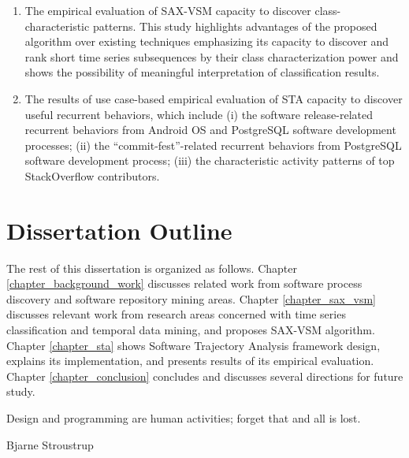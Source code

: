 \begin{enumerate}
\begin{enumerate}
 \item The empirical evaluation of SAX-VSM capacity to discover class-characteristic patterns.
This study highlights advantages of the proposed algorithm over existing techniques 
emphasizing
its capacity to discover and rank short time series subsequences by their class 
characterization power and 
shows the possibility of meaningful interpretation of classification results.
 \item The results of use case-based empirical evaluation of STA capacity to discover useful recurrent 
behaviors, which include 
(i) the software release-related recurrent behaviors from Android OS and PostgreSQL software development processes;
(ii) the ``commit-fest''-related recurrent behaviors from PostgreSQL software development process; 
(iii) the characteristic activity patterns of top StackOverflow contributors.
\end{enumerate}

\end{enumerate}

\section{Dissertation Outline}\label{section_organization}
The rest of this dissertation is organized as follows. 
Chapter \ref{chapter_background_work} discusses related work from software process discovery and software repository mining areas.
Chapter \ref{chapter_sax_vsm} discusses relevant work from research areas concerned with time series classification and temporal data mining, and proposes SAX-VSM algorithm.
Chapter \ref{chapter_sta} shows Software Trajectory Analysis framework design, explains its implementation, and presents results of its empirical evaluation. 
Chapter \ref{chapter_conclusion} concludes and discusses several directions for future study.

\epigraph{Design and programming are human activities; forget that and all is lost.}{Bjarne Stroustrup}